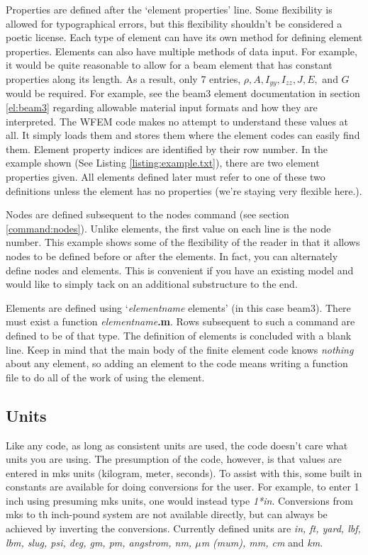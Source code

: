 \documentclass[12pt]{article}
\newcommand*{\sarg}[1]{\textit{#1}}
\newcommand*{\command}[1]{\textsf{#1}}
\newcommand*{\variable}[1]{\textit{#1}}
\newcommand*{\filename}[1]{\textsf{\textbf{#1}}}
\begin{document}
Properties are defined after the `element properties' line. Some flexibility is allowed for typographical errors, but this flexibility shouldn't be considered a poetic license. Each type of element can have its own method for defining element properties. Elements can also have multiple methods of data input. For example, it would be quite reasonable to allow for a beam element that has constant properties along its length. As a result, only 7 entries, $\rho, A, I_{yy}, I_{zz}, J, E,$ and $G$ would be required. For example, see the \command{beam3} element documentation in section \ref{el:beam3} regarding allowable material input formats and how they are interpreted. The WFEM code makes no attempt to understand these values at all. It simply loads them and stores them where the element codes can easily find them. Element property indices are identified by their row number. In the example shown (See Listing \ref{listing:example.txt}), there are two element properties given. All elements defined later must refer to one of these two definitions unless the element has no properties (we're staying very flexible here.).

Nodes are defined subsequent to the
\command{nodes} command (see section \ref{command:nodes}). Unlike elements, the first value on each line is the node number. This example shows some of the flexibility of the reader in that it allows nodes to be defined before or after the elements. In fact, you can alternately define nodes and elements. This is convenient if you have an existing model and would like to simply tack on an additional substructure to the end.

Elements are defined using `\sarg{elementname} \command{elements}' (in
this case \command{beam3}). There must exist a function
\sarg{elementname}\filename{.m}. Rows subsequent to such a command are
defined to be of that type. The definition of elements is concluded
with a blank line. Keep in mind that the main body of the finite
element code knows \emph{nothing} about any element, so adding an
element to the code means writing a function file to do all of the
work of using the element.

\subsection{Units}
Like any code, as long as consistent units are used, the code doesn't care what units you are using. The presumption of the code, however, is that values are entered in mks units (kilogram, meter, seconds). To assist with this, some built in constants are available for doing conversions for the user. For example, to enter 1 inch  using presuming mks units, one would instead type \variable{1*in}. Conversions from mks to th inch-pound system are not available directly, but can always be achieved by inverting the conversions. Currently defined units are \variable{in, ft, yard, lbf, lbm, slug, psi, deg, gm, pm, angstrom, nm, $\mu$m (mum), mm, cm} and \variable{km}.
\end{document}
